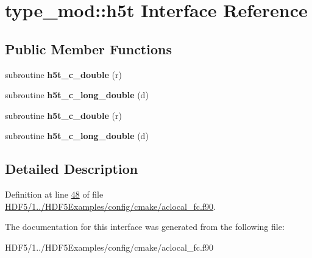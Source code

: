 \hypertarget{interfacetype__mod_1_1h5t}{}\section{type\+\_\+mod\+:\+:h5t Interface Reference}
\label{interfacetype__mod_1_1h5t}
\subsection*{Public Member Functions}
\begin{DoxyCompactItemize}
\item 
\mbox{\label{interfacetype__mod_1_1h5t_a994ff4ee368ca93e8075523a7a878f03}} 
subroutine {\bfseries h5t\+\_\+c\+\_\+double} (r)
\item 
\mbox{\label{interfacetype__mod_1_1h5t_ad3258d307e432c97edf05d4db7b248a5}} 
subroutine {\bfseries h5t\+\_\+c\+\_\+long\+\_\+double} (d)
\item 
\mbox{\label{interfacetype__mod_1_1h5t_a994ff4ee368ca93e8075523a7a878f03}} 
subroutine {\bfseries h5t\+\_\+c\+\_\+double} (r)
\item 
\mbox{\label{interfacetype__mod_1_1h5t_ad3258d307e432c97edf05d4db7b248a5}} 
subroutine {\bfseries h5t\+\_\+c\+\_\+long\+\_\+double} (d)
\end{DoxyCompactItemize}


\subsection{Detailed Description}


Definition at line \hyperlink{_h_d_f5_21_810_81_2_h_d_f5_examples_2config_2cmake_2aclocal__fc_8f90_source_l00048}{48} of file \hyperlink{_h_d_f5_21_810_81_2_h_d_f5_examples_2config_2cmake_2aclocal__fc_8f90_source}{H\+D\+F5/1../\+H\+D\+F5\+Examples/config/cmake/aclocal\+\_\+fc.\+f90}.



The documentation for this interface was generated from the following file\+:\begin{DoxyCompactItemize}
\item 
H\+D\+F5/1../\+H\+D\+F5\+Examples/config/cmake/aclocal\+\_\+fc.\+f90\end{DoxyCompactItemize}
